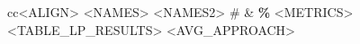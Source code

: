 \documentclass[border=0cm]{standalone}
\begin{document}
\fontsize{9.}{9.}\selectfont
\setlength\tabcolsep{2.5pt}
\begin{tabular}{cc<ALIGN>}
\toprule
{} %
<NAMES>
<NAMES2>
\# & \textbf{\%}
<METRICS>
\\ 
\hline
<TABLE_LP_RESULTS>
<AVG_APPROACH>
\\ \bottomrule
\end{tabular}
\end{document}
